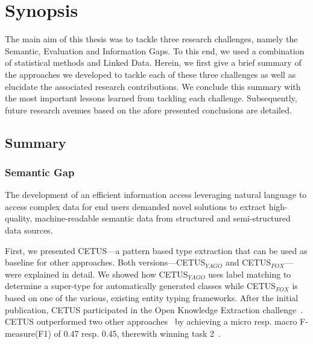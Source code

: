 \chapter{Synopsis}





The main aim of this thesis was to tackle three research challenges, namely the Semantic, Evaluation and Information Gaps. To this end, we used a combination of statistical methods and Linked Data. Herein, we first give a brief summary of the approaches we developed to tackle each of these three challenges as well as elucidate the associated research contributions. We conclude this summary with the most important lessons learned from tackling each challenge.
Subsequently, future research avenues based on the afore presented conclusions are detailed.
 
\section{Summary}
\subsection*{Semantic Gap}

The development of an efficient information access leveraging natural language to access complex data for end users demanded novel solutions to extract high-quality, machine-readable semantic data from structured and semi-structured data sources.

First, we presented CETUS---a pattern based type extraction that can be used as baseline for other approaches.
Both versions---CETUS$_{YAGO}$ and CETUS$_{FOX}$---were explained in detail.
We showed how CETUS$_{YAGO}$ uses label matching to determine a super-type for automatically generated classes while CETUS$_{FOX}$ is based on one of the various, existing entity typing frameworks.
After the initial publication, CETUS participated in the Open Knowledge Extraction challenge~\cite{okechallenge}.
CETUS outperformed two other approaches~\cite{fred_typing,oak_sheffield} by achieving a  micro resp. macro F-measure(F1) of 0.47 resp. 0.45, therewith winning task 2~\cite{okechallenge}.	

